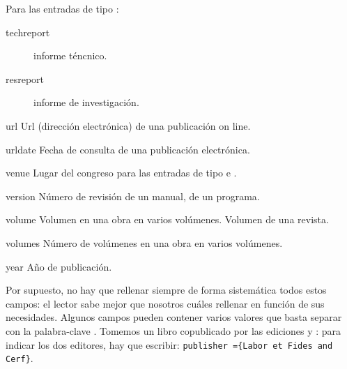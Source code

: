 \begin{choix}
					Para las entradas de tipo : \nopagebreak
					\begin{description}
						\item[techreport]informe
                                                  téncnico.
						\item[resreport]informe
                                                  de investigación.
					\end{description}

	\item[url] Url (dirección electrónica) de una publicación on line.
   	\item[urldate] Fecha de consulta de una publicación electrónica.
   	\item[venue] Lugar del congreso para las entradas de tipo  e .
   	\item[version] Número de revisión de un manual, de un programa.
   	\item[volume] Volumen en una obra en varios volúmenes. Volumen
          de una revista.
   	\item[volumes] Número de volúmenes en una obra en varios volúmenes.
   	\item[year] Año de publicación.
\end{choix}


Por supuesto, no hay que rellenar siempre de forma sistemática todos
estos campos: el lector sabe mejor que nosotros cuáles rellenar en
función de sus necesidades. Algunos campos pueden contener varios
valores que basta separar con la palabra-clave . Tomemos un
libro copublicado por las ediciones  y
: para indicar los dos editores, hay que escribir:
\verb|publisher ={Labor et Fides and Cerf}|.



